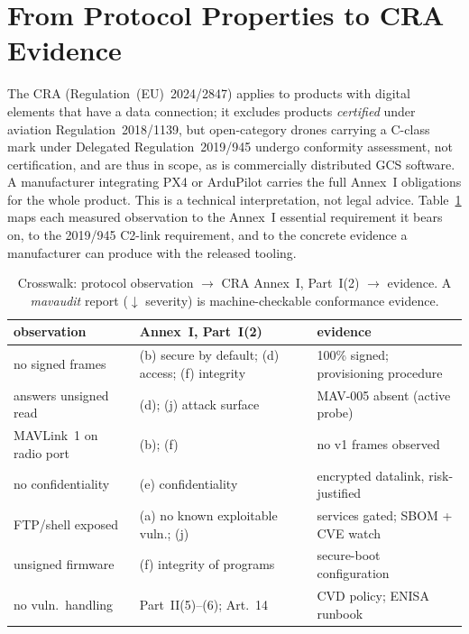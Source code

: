 \documentclass[conference]{IEEEtran}
\begin{document}
\section{From Protocol Properties to CRA Evidence}
\label{sec:cra}

The CRA (Regulation~(EU)~2024/2847) applies to products with digital elements
that have a data connection; it excludes products \emph{certified} under
aviation Regulation~2018/1139, but open-category drones carrying a C-class mark
under Delegated Regulation~2019/945 undergo conformity assessment, not
certification, and are thus in scope, as is commercially distributed GCS
software. A manufacturer integrating PX4 or ArduPilot carries the full Annex~I
obligations for the whole product. This is a technical interpretation, not legal
advice. Table~\ref{tab:cra} maps each measured observation to the Annex~I
essential requirement it bears on, to the 2019/945 C2-link requirement, and to
the concrete evidence a manufacturer can produce with the released tooling.

\begin{table}[t]
\caption{Crosswalk: protocol observation $\to$ CRA Annex~I, Part~I(2) $\to$
evidence. A \emph{mavaudit} report ($\downarrow$ severity) is machine-checkable
conformance evidence.}
\label{tab:cra}
\centering\footnotesize
\setlength{\tabcolsep}{3pt}
\renewcommand{\arraystretch}{1.15}
\begin{tabular}{@{}p{2.5cm}p{2.3cm}p{2.5cm}@{}}
\toprule
observation & Annex~I, Part~I(2) & evidence \\
\midrule
no signed frames & (b) secure by default; (d) access; (f) integrity &
100\% signed; provisioning procedure \\
answers unsigned read & (d); (j) attack surface &
MAV-005 absent (active probe) \\
MAVLink~1 on radio port & (b); (f) &
no v1 frames observed \\
no confidentiality & (e) confidentiality &
encrypted datalink, risk-justified \\
FTP/shell exposed & (a) no known exploitable vuln.; (j) &
services gated; SBOM + CVE watch \\
unsigned firmware & (f) integrity of programs &
secure-boot configuration \\
no vuln.\ handling & Part~II(5)--(6); Art.~14 &
CVD policy; ENISA runbook \\
\bottomrule
\end{tabular}
\end{table}
\end{document}
